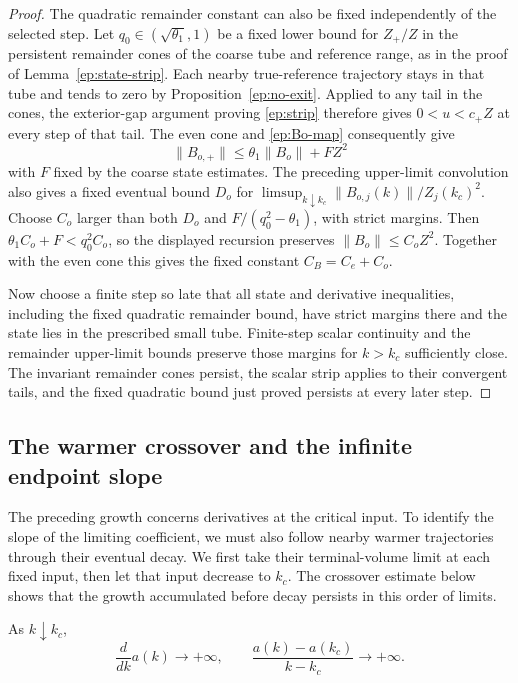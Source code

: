\begin{proof}
The quadratic remainder constant can also be fixed independently of
the selected step.  Let $q_0\in(\sqrt{\theta_1},1)$ be a fixed
lower bound for $Z_+/Z$ in the persistent remainder cones of the
coarse tube and reference range, as in the proof of
Lemma~\ref{ep:state-strip}.  Each nearby true-reference trajectory
stays in that tube and
tends to zero by Proposition~\ref{ep:no-exit}.  Applied to any tail
in the cones, the exterior-gap argument proving \eqref{ep:strip}
therefore gives $0<u<c_+Z$ at every step of that tail.  The even cone
and \eqref{ep:Bo-map} consequently give
\[
 \|B_{o,+}\|\le\theta_1\|B_o\|+FZ^2
\]
with $F$ fixed by the coarse state estimates.  The preceding
upper-limit convolution also gives a fixed eventual bound $D_o$ for
$\limsup_{k\downarrow k_c}\|B_{o,j}(k)\|/Z_j(k_c)^2$.
Choose $C_o$ larger than both $D_o$ and
$F/(q_0^2-\theta_1)$, with strict margins.  Then
$\theta_1C_o+F<q_0^2C_o$, so the displayed recursion preserves
$\|B_o\|\le C_oZ^2$.  Together with the even cone this gives the
fixed constant $C_B=C_e+C_o$.

Now choose a finite step so late that all state and derivative
inequalities, including the fixed quadratic remainder bound, have
strict margins there and the state lies in the prescribed small
tube.  Finite-step scalar continuity and the remainder upper-limit
bounds preserve those margins for $k>k_c$ sufficiently close.
The invariant remainder cones persist, the scalar strip applies
to their convergent tails, and the fixed quadratic bound just proved
persists at every later step.
\end{proof}

\subsection{The warmer crossover and the infinite endpoint slope}

The preceding growth concerns derivatives at the critical input.
To identify the slope of the limiting coefficient, we must also follow
nearby warmer trajectories through their eventual decay.  We first take
their terminal-volume limit at each fixed input, then let that input
decrease to $k_c$.  The crossover estimate below shows that the growth
accumulated before decay persists in this order of limits.

\begin{proposition}
\label{ep:infinite-response}
As $k\downarrow k_c$,
\begin{equation}\label{ep:infinite-derivative}
 \frac{d}{dk}a(k)\longrightarrow+\infty ,
 \qquad
 \frac{a(k)-a(k_c)}{k-k_c}\longrightarrow+\infty .
\end{equation}
\end{proposition}

